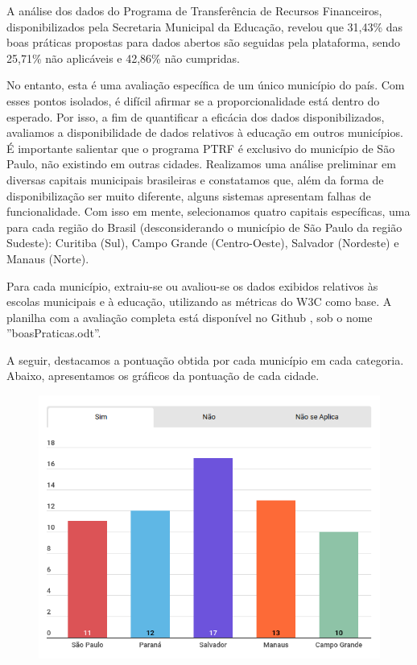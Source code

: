 A análise dos dados do Programa de Transferência de Recursos Financeiros, disponibilizados pela Secretaria Municipal da Educação, revelou que 31,43\% das boas práticas propostas para dados abertos são seguidas pela plataforma, sendo 25,71\% não aplicáveis e 42,86\% não cumpridas.

No entanto, esta é uma avaliação específica de um único município do país. Com esses pontos isolados, é difícil afirmar se a proporcionalidade está dentro do esperado. Por isso, a fim de quantificar a eficácia dos dados disponibilizados, avaliamos a disponibilidade de dados relativos à educação em outros municípios. É importante salientar que o programa PTRF é exclusivo do município de São Paulo, não existindo em outras cidades. Realizamos uma análise preliminar em diversas capitais municipais brasileiras e constatamos que, além da forma de disponibilização ser muito diferente, alguns sistemas apresentam falhas de funcionalidade. Com isso em mente, selecionamos quatro capitais específicas, uma para cada região do Brasil (desconsiderando o município de São Paulo da região Sudeste): Curitiba (Sul), Campo Grande (Centro-Oeste), Salvador (Nordeste) e Manaus (Norte).

Para cada município, extraiu-se ou avaliou-se os dados exibidos relativos às escolas municipais e à educação, utilizando as métricas do W3C como base. A planilha com a avaliação completa está disponível no Github \cite{GitHub}, sob o nome ''boasPraticas.odt''.

A seguir, destacamos a pontuação obtida por cada município em cada categoria. Abaixo, apresentamos os gráficos da pontuação de cada cidade.

\begin{figure}[H]
    \centering
    \includegraphics[scale=0.5]{images/grafico2.png}
    \label{fig:3}
\end{figure}


